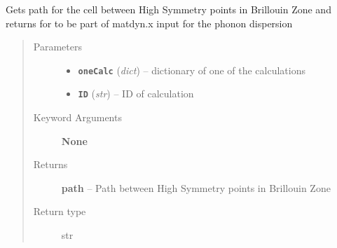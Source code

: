 \documentclass[letterpaper,10pt,english]{sphinxmanual}
\begin{document}

\begin{fulllineitems}
\label{run:run.__phonon_band_path}
Gets path for the cell between High Symmetry points in Brillouin Zone
and returns for to be part of matdyn.x input for the phonon dispersion
\begin{quote}\begin{description}
\item[{Parameters}] \leavevmode\begin{itemize}
\item {} 
\textbf{\texttt{oneCalc}} (\emph{dict}) -- dictionary of one of the calculations

\item {} 
\textbf{\texttt{ID}} (\emph{str}) -- ID of calculation

\end{itemize}

\item[{Keyword Arguments}] \leavevmode
\textbf{None}

\item[{Returns}] \leavevmode
\textbf{path} --
Path between High Symmetry points in Brillouin Zone

\item[{Return type}] \leavevmode
str

\end{description}\end{quote}

\end{fulllineitems}

\end{document}
